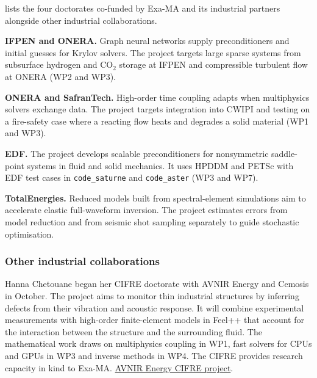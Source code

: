  lists the four doctorates
co-funded by Exa-MA and its industrial partners alongside other
industrial collaborations.



\textbf{IFPEN and ONERA.}
Graph neural networks supply preconditioners and initial guesses for Krylov
solvers. The project targets large sparse systems from subsurface hydrogen
and CO$_2$ storage at IFPEN and compressible turbulent flow at ONERA (WP2 and WP3).

\textbf{ONERA and SafranTech.}
High-order time coupling adapts when multiphysics solvers exchange data.
The project targets integration into CWIPI and testing on a fire-safety
case where a reacting flow heats and degrades a solid material (WP1 and WP3).

\textbf{EDF.}
The project develops scalable preconditioners for nonsymmetric saddle-point
systems in fluid and solid mechanics. It uses HPDDM and PETSc with EDF test
cases in \texttt{code\_saturne} and \texttt{code\_aster} (WP3 and WP7).

\begin{samepage}
\textbf{TotalEnergies.}
Reduced models built from spectral-element simulations aim to accelerate elastic
full-waveform inversion. The project estimates errors from model reduction and
from seismic shot sampling separately to guide stochastic optimisation.
\par
\end{samepage}

\begin{samepage}
\subsubsection*{Other industrial collaborations}

Hanna Chetouane began her CIFRE doctorate with AVNIR Energy and
Cemosis in October. The project aims to monitor thin industrial
structures by inferring defects from their vibration and acoustic
response. It will combine experimental measurements with high-order
finite-element models in Feel++ that account for the interaction
between the structure and the surrounding fluid. The mathematical
work draws on multiphysics coupling in WP1, fast solvers for CPUs
and GPUs in WP3 and inverse methods in WP4. The CIFRE provides
research capacity in kind to Exa-MA.
\href{https://www.cemosis.fr/en/news/cifre-avnir-energy/}{AVNIR Energy CIFRE project}.
\end{samepage}

